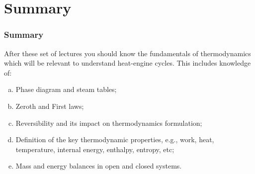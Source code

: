 \documentclass[10pt,compress]{beamer}
\begin{document}
\section{Summary}
\begin{frame}
 \frametitle{Summary}
After these set of lectures you should know the fundamentals of thermodynamics which will be relevant to understand heat-engine cycles. This includes knowledge of: 
 \begin{enumerate}[(a)]
  \item <2-> Phase diagram and steam tables;
  \item <3-> Zeroth and First laws;
  \item <4-> Reversibility and its impact on thermodynamics formulation;
  \item <5-> Definition of the key thermodynamic properties, e.g., work, heat, temperature, internal energy, enthalpy, entropy, etc;
  \item <6-> Mass and energy balances in open and closed systems.
 \end{enumerate}
\end{frame}

 


%  
\end{document}
